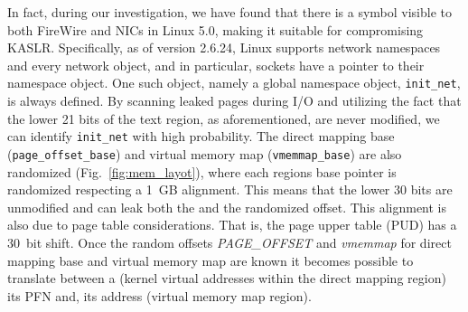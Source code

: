 In fact, during our investigation, we have found that there is a symbol visible to both FireWire and NICs in Linux 5.0, making it suitable for compromising KASLR. Specifically, as of version 2.6.24, Linux supports network namespaces and every network object, and in particular, sockets have a pointer to their namespace object. One such object, namely a global namespace object, \texttt{init\_net}, is always defined. By scanning leaked pages during I/O and utilizing the fact that the lower 21 bits of the text region, as aforementioned, are never modified, we can identify \texttt{init\_net} with high probability.
The direct mapping base (\texttt{page\_offset\_base}) and virtual memory map (\texttt{vmemmap\_base}) are also randomized (Fig.~\ref{fig:mem_layot}), where each regions base pointer is randomized respecting a 1~GB alignment. This means that the lower 30 bits are unmodified and can leak both the \DIFdelbegin {}\DIFdelend \DIFaddbegin {}\DIFaddend and the randomized offset. This alignment is also due to page table considerations. That is, the page upper table (PUD) has a 30~bit shift. Once the random offsets \textit{PAGE\_OFFSET} and \textit{vmemmap} for direct mapping base and virtual memory map are known it becomes possible to translate between a \kva{} (kernel virtual addresses within the direct mapping region) its PFN and, its \page{} address (virtual memory map region).

